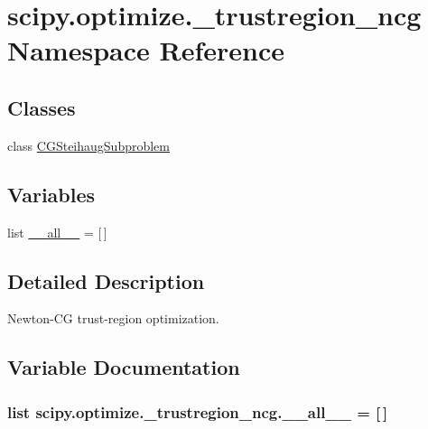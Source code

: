 \hypertarget{namespacescipy_1_1optimize_1_1__trustregion__ncg}{}\section{scipy.\+optimize.\+\_\+trustregion\+\_\+ncg Namespace Reference}
\label{namespacescipy_1_1optimize_1_1__trustregion__ncg}
\subsection*{Classes}
\begin{DoxyCompactItemize}
\item 
class \hyperlink{classscipy_1_1optimize_1_1__trustregion__ncg_1_1CGSteihaugSubproblem}{C\+G\+Steihaug\+Subproblem}
\end{DoxyCompactItemize}
\subsection*{Variables}
\begin{DoxyCompactItemize}
\item 
list \hyperlink{namespacescipy_1_1optimize_1_1__trustregion__ncg_a234bd18292aaba2d166bfbff968e7f04}{\+\_\+\+\_\+all\+\_\+\+\_\+} = \mbox{[}$\,$\mbox{]}
\end{DoxyCompactItemize}


\subsection{Detailed Description}
\begin{DoxyVerb}Newton-CG trust-region optimization.\end{DoxyVerb}
 

\subsection{Variable Documentation}
\hypertarget{namespacescipy_1_1optimize_1_1__trustregion__ncg_a234bd18292aaba2d166bfbff968e7f04}{}
\subsubsection[{\+\_\+\+\_\+all\+\_\+\+\_\+}]{\setlength{\rightskip}{0pt plus 5cm}list scipy.\+optimize.\+\_\+trustregion\+\_\+ncg.\+\_\+\+\_\+all\+\_\+\+\_\+ = \mbox{[}$\,$\mbox{]}}\label{namespacescipy_1_1optimize_1_1__trustregion__ncg_a234bd18292aaba2d166bfbff968e7f04}
